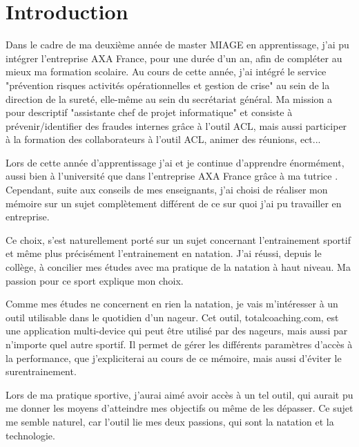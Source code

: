 \section*{Introduction}


Dans le cadre de ma deuxième année de master MIAGE en apprentissage, j'ai pu intégrer l'entreprise AXA France, pour une durée d'un an, afin de compléter au mieux ma formation scolaire. Au cours de cette année, j'ai intégré le service "prévention risques activités opérationnelles et gestion de crise" au sein de la direction de la sureté, elle-même au sein du secrétariat général. Ma mission a pour descriptif "assistante chef de projet informatique" et consiste à prévenir/identifier des fraudes internes grâce à l'outil ACL, mais aussi participer à la formation des collaborateurs à l'outil ACL, animer des réunions, ect...

Lors de cette année d'apprentissage j'ai et je continue d'apprendre énormément, aussi bien à l'université que dans l'entreprise AXA France grâce à ma tutrice {\MaitreApp}. Cependant, suite aux conseils de mes enseignants, j'ai choisi de réaliser mon mémoire sur un sujet complètement différent de ce sur quoi j'ai pu travailler en entreprise.

\vspace{12pt}

Ce choix, s'est naturellement porté sur un sujet concernant l'entrainement sportif et même plus précisément l'entrainement en natation. J'ai réussi, depuis le collège, à concilier mes études avec ma pratique de la natation à haut niveau. Ma passion pour ce sport explique mon choix.

Comme mes études ne concernent en rien la natation, je vais m'intéresser à un outil utilisable dans le quotidien d'un nageur. Cet outil, totalcoaching.com, est une application multi-device qui peut être utilisé par des nageurs, mais aussi par n'importe quel autre sportif. Il permet de gérer les différents paramètres d'accès à la performance, que j'expliciterai au cours de ce mémoire, mais aussi d'éviter le surentrainement.

Lors de ma pratique sportive, j'aurai aimé avoir accès à un tel outil, qui aurait pu me donner les moyens d'atteindre mes objectifs ou même de les dépasser. Ce sujet me semble naturel, car l'outil lie mes deux passions, qui sont la natation et la technologie.

\vspace{12pt}

